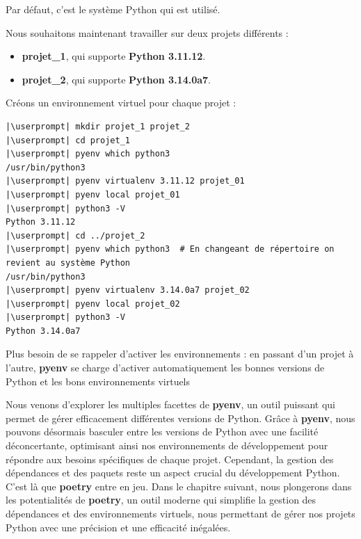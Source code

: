 Par défaut, c'est le système Python qui est utilisé.

Nous souhaitons maintenant travailler sur deux projets différents :
\begin{itemize}
    \item \textbf{projet\_1}, qui supporte \textbf{Python 3.11.12}.
    \item \textbf{projet\_2}, qui supporte \textbf{Python 3.14.0a7}.
\end{itemize}

Créons un environnement virtuel pour chaque projet :
\begin{lstlisting}[style=bash]
|\userprompt| mkdir projet_1 projet_2
|\userprompt| cd projet_1
|\userprompt| pyenv which python3
/usr/bin/python3
|\userprompt| pyenv virtualenv 3.11.12 projet_01
|\userprompt| pyenv local projet_01
|\userprompt| python3 -V
Python 3.11.12
|\userprompt| cd ../projet_2
|\userprompt| pyenv which python3  # En changeant de répertoire on revient au système Python
/usr/bin/python3
|\userprompt| pyenv virtualenv 3.14.0a7 projet_02
|\userprompt| pyenv local projet_02
|\userprompt| python3 -V
Python 3.14.0a7
\end{lstlisting}

Plus besoin de se rappeler d'activer les environnements : en passant d'un projet à l'autre, \textbf{pyenv} se charge d'activer automatiquement les bonnes versions de Python et les bons environnements virtuels
\bigskip

\begin{center}
\end{center}

Nous venons d'explorer les multiples facettes de \textbf{pyenv}, un outil puissant qui permet de gérer efficacement différentes versions de Python. Grâce à \textbf{pyenv}, nous pouvons désormais basculer entre les versions de Python avec une facilité déconcertante, optimisant ainsi nos environnements de développement pour répondre aux besoins spécifiques de chaque projet. Cependant, la gestion des dépendances et des paquets reste un aspect crucial du développement Python. C'est là que \textbf{poetry} entre en jeu. Dans le chapitre suivant, nous plongerons dans les potentialités de \textbf{poetry}, un outil moderne qui simplifie la gestion des dépendances et des environnements virtuels, nous permettant de gérer nos projets Python avec une précision et une efficacité inégalées.

